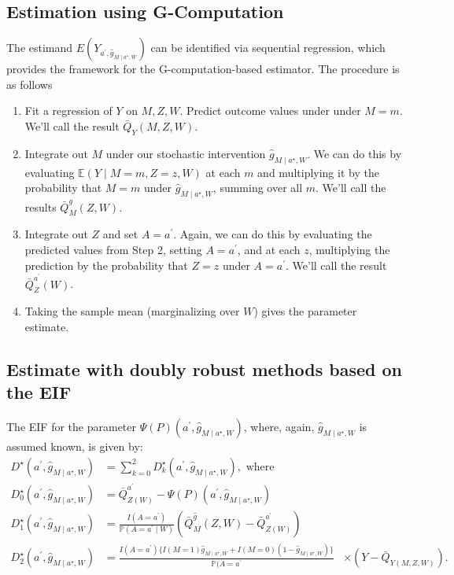 \documentclass[
  12pt,
]{book}
\providecommand{\tightlist}{%
  \setlength{\itemsep}{0pt}\setlength{\parskip}{0pt}}
\theoremstyle{definition}
\theoremstyle{definition}
\theoremstyle{definition}
\renewcommand{\P}{\mathbb{P}}
\newcommand{\E}{\mathbb{E}}
\newcommand{\1}{\mathbbm{1}}
\begin{document}
\hypertarget{estimation-using-g-computation}{%
\subsection{Estimation using G-Computation}\label{estimation-using-g-computation}}

The estimand \(E(Y_{a^\prime, \hat{g}_{M \mid a^\star,W}})\) can be identified
via sequential regression, which provides the framework for the
G-computation-based estimator. The procedure is as follows

\begin{enumerate}
\def\labelenumi{\arabic{enumi}.}
\tightlist
\item
  Fit a regression of \(Y\) on \(M,Z,W\). Predict outcome values under under
  \(M=m\). We'll call the result \(\bar{Q}_Y(M,Z,W)\).
\item
  Integrate out \(M\) under our stochastic intervention
  \(\hat{g}_{M \mid a^{\star}, W}\). We can do this by evaluating
  \(\E(Y \mid M=m,Z=z,W)\) at each \(m\) and multiplying it by the probability
  that \(M=m\) under \(\hat{g}_{M \mid a^{\star}, W}\), summing over all \(m\).
  We'll call the results \(\bar{Q}^{g}_M(Z,W)\).
\item
  Integrate out \(Z\) and set \(A=a^\prime\). Again, we can do this by evaluating
  the predicted values from Step 2, setting \(A=a^\prime\), and at each \(z\),
  multiplying the prediction by the probability that \(Z=z\) under \(A=a^\prime\).
  We'll call the result \(\bar{Q}^{a^\prime}_Z(W)\).
\item
  Taking the sample mean (marginalizing over \(W\)) gives the parameter
  estimate.
\end{enumerate}

\hypertarget{estimate-with-doubly-robust-methods-based-on-the-eif}{%
\subsection{Estimate with doubly robust methods based on the EIF}\label{estimate-with-doubly-robust-methods-based-on-the-eif}}

The EIF for the parameter \(\Psi(P)(a^{\prime}, \hat{g}_{M \mid a^{\star},W})\),
where, again, \(\hat{g}_{M \mid a^{\star}, W}\) is assumed known, is given by:
\begin{align*}
  D^{\star}(a^{\prime}, \hat{g}_{M \mid a^{\star}, W}) &= \sum_{k=0}^2
      D_k^{\star}(a^{\prime}, \hat{g}_{M \mid a^{\star}, W}), \text{ where }\\
  D^{\star}_0(a^{\prime}, \hat{g}_{M \mid a^{\star}, W}) &=
      \bar{Q}^{a^{\prime}}_{Z(W)} -
      \Psi(P)(a^{\prime}, \hat{g}_{M \mid a^{\star}, W})\\
  D^{\star}_1(a^{\prime}, \hat{g}_{M \mid a^{\star}, W}) &=
      \frac{I(A=a^{\prime})}{\P(A=a^{\prime} \mid W)}(\bar{Q}^{\hat{g}}_M(Z,W)
      - \bar{Q}^{a^{\prime}}_{Z(W)})\\
  D^{\star}_2(a^{\prime}, \hat{g}_{M \mid a^{\star}, W}) &=
      \frac{I(A=a^{\prime})\{I(M=1) \hat{g}_{M \mid a^{\star}, W} +
      I(M=0)(1-\hat{g}_{M \mid a^{\star}, W}) \}}{\P(A=a^{\prime}}
      &\times (Y-\bar{Q}_{Y(M,Z,W)}).
\end{align*}
\end{document}
